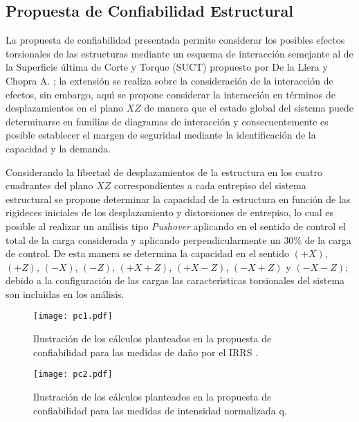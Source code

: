 \newpage

\subsection{Propuesta de Confiabilidad Estructural}

La propuesta de confiabilidad presentada permite considerar los posibles efectos torsionales de las estructuras mediante un esquema de interacci\'on semejante al de la Superficie \'ultima de Corte y Torque (SUCT) propuesto por De la Llera y Chopra A. \cite{DC1994}; la extensi\'on se realiza sobre la consideraci\'on de la interacci\'on de efectos, sin embargo, aqu\'{\i} se propone considerar la interacci\'on en t\'erminos de desplazamientos en el plano $XZ$ de manera que el estado global del sistema puede determinarse en familias de diagramas de interacci\'on y consecuentemente es posible establecer el margen de seguridad mediante  la identificaci\'on de la capacidad y la demanda.

Considerando la libertad de desplazamientos de la estructura en los cuatro cuadrantes del plano $XZ$ correspondientes a cada entrepiso del sistema estructural se propone determinar la capacidad de la estructura en funci\'on de las rigideces iniciales de los desplazamiento y distorsiones de entrepiso, lo cual es posible al realizar un an\'alisis tipo \emph{Pushover} aplicando en el sentido de control el total de la carga considerada y aplicando  perpendicularmente un $30\%$ de la carga de control. De esta manera se determina la capacidad en el sentido $(+X)$, $(+Z)$, $(-X)$, $(-Z)$, $(+X+Z)$, $(+X-Z)$, $(-X+Z)$ y $(-X-Z)$; debido a la configuraci\'on de las cargas las caracter\'{\i}sticas torsionales del sistema son incluidas en los an\'alisis. 

\begin{figure} [htbp]
\texttt{[image: pc1.pdf]}
\caption{Ilustraci\'on de los c\'alculos planteados en la propuesta de confiabilidad para las medidas de da\~no por el IRRS \cite{DE2006}.}
\label{fig:pc1}
\end{figure}

\begin{figure} [htbp]
\texttt{[image: pc2.pdf]}
\caption{Ilustraci\'on de los c\'alculos planteados en la propuesta de confiabilidad para las medidas de intensidad normalizada q.}
\label{fig:pc2}
\end{figure}

